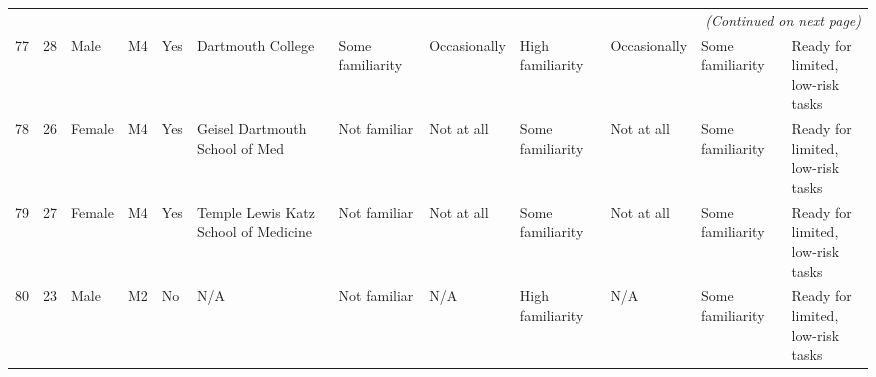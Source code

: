 \documentclass[11pt]{article}
\begin{document}
\begin{landscape}
{\begin{longtable}{rlllllllllll}
\midrule
\multicolumn{12}{r}{\textit{(Continued on next page)}}\\
\endfoot

\bottomrule
\endlastfoot

77 & 28 & Male & M4 & Yes & Dartmouth College & Some familiarity & Occasionally & High familiarity & Occasionally & Some familiarity & \makecell[l]{Ready for limited, \\low-risk tasks} \\
78 & 26 & Female & M4 & Yes & Geisel Dartmouth School of Med & Not familiar & Not at all & Some familiarity & Not at all & Some familiarity & \makecell[l]{Ready for limited, \\low-risk tasks} \\
79 & 27 & Female & M4 & Yes & Temple Lewis Katz School of Medicine & Not familiar & Not at all & Some familiarity & Not at all & Some familiarity & \makecell[l]{Ready for limited, \\low-risk tasks} \\
80 & 23 & Male & M2 & No & N/A & Not familiar & N/A & High familiarity & N/A & Some familiarity & \makecell[l]{Ready for limited, \\low-risk tasks} \\

\end{longtable}
}
\end{landscape}
\end{document}
